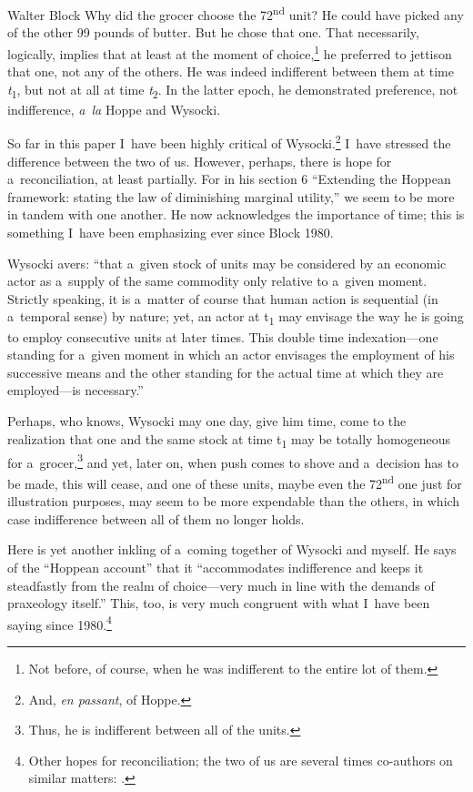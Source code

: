 \begin{artengenv}{Walter Block}
Why did the grocer choose the 72\textsuperscript{nd} unit? He could have picked any of the other 99 pounds of butter. But he chose that one. That necessarily, logically, implies that at least at the moment of choice,\footnote{Not before, of course, when he was indifferent to the entire lot of them.} he preferred to jettison that one, not any of the others. He was indeed indifferent between them at time \textit{t}\textsubscript{1}, but not at all at time \textit{t}\textsubscript{2}. In the latter epoch, he demonstrated preference, not indifference, \textit{a~la} Hoppe and Wysocki.

So far in this paper I~have been highly critical of Wysocki.\footnote{And, \textit{en passant}, of Hoppe.} I~have stressed the difference between the two of us. However, perhaps, there is hope for a~reconciliation, at least partially. For in his section 6 ``Extending the Hoppean framework: stating the law of diminishing marginal utility,'' we seem to be more in tandem with one another. He now acknowledges the importance of time; this is something I~have been emphasizing ever since Block 1980.

Wysocki avers: ``that a~given stock of units may be considered by an economic actor as a~supply of the same commodity only relative to a~given moment. Strictly speaking, it is a~matter of course that human action is sequential (in a~temporal sense) by nature; yet, an actor at t\textsubscript{1} may envisage the way he is going to employ consecutive units at later times. This double time indexation---one standing for a~given moment in which an actor envisages the employment of his successive means and the other standing for the actual time at which they are employed---is necessary.''

Perhaps, who knows, Wysocki may one day, give him time, come to the realization that one and the same stock at time t\textsubscript{1} may be totally homogeneous for a~grocer,\footnote{Thus, he is indifferent between all of the units.} and yet, later on, when push comes to shove and a~decision has to be made, this will cease, and one of these units, maybe even the 72\textsuperscript{nd} one just for illustration purposes, may seem to be more expendable than the others, in which case indifference between all of them no longer holds.

Here is yet another inkling of a~coming together of Wysocki and myself. He says of the ``Hoppean account'' that it ``accommodates indifference and keeps it steadfastly from the realm of choice---very much in line with the demands of praxeology itself.'' This, too, is very much congruent with what I~have been saying since 1980.\footnote{Other hopes for reconciliation; the two of us are several times co-authors on similar matters:
\parencites[][]{wysocki_analysis_2018}[][]{wysocki_homogeneity_2019}.%
}


\end{artengenv}
